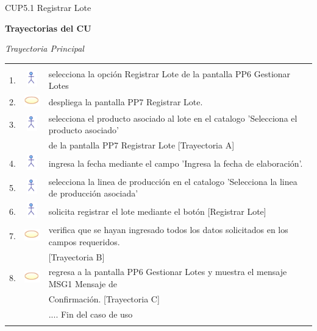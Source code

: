 \documentclass[10pt,spanish]{article}
\providecommand{\tabularnewline}{\\}
\begin{document}
\begin{table}[!ht]
	\caption{CUP5.1 Registrar Lote}
	\label{tab:CasosdeUso:nombredecasodeuso} 
	\end{table}
	\newpage
	\textbf{\large Trayectorias del CU}{\large \par}
	\textit{\large Trayectoria Principal}{\large{} }{\large \par}
	\begin{tabular}{ccl}
	 &  & \tabularnewline
	1. & \includegraphics{actor} & selecciona la opción Registrar Lote de la pantalla PP6 Gestionar Lotes\tabularnewline	
	2. & \includegraphics{sistema} & despliega la pantalla PP7 Registrar Lote.\tabularnewline			 		 
	3. & \includegraphics{actor} & selecciona el producto asociado al lote en el catalogo 'Selecciona el producto asociado'\tabularnewline
	& &   de la pantalla PP7 Registrar Lote [Trayectoria A] \tabularnewline
	4. & \includegraphics{actor} & ingresa la fecha mediante el campo 'Ingresa la fecha de elaboración'.\tabularnewline
	5. & \includegraphics{actor} & selecciona la linea de producción en el catalogo 'Selecciona la linea de producción asociada' \tabularnewline
	6. & \includegraphics{actor} & solicita registrar el lote mediante el botón [Registrar Lote]\tabularnewline
	7. & \includegraphics{sistema} & verifica que se hayan ingresado todos los datos solicitados en los campos requeridos.\tabularnewline
	& & [Trayectoria B]\tabularnewline
	8. & \includegraphics{sistema} & regresa a la pantalla PP6 Gestionar Lotes y muestra el mensaje MSG1 Mensaje de \tabularnewline
	& & Confirmación. [Trayectoria C]\tabularnewline
	 &  & .... Fin del caso de uso\tabularnewline \\
	\end{tabular}		
	
\end{document}
